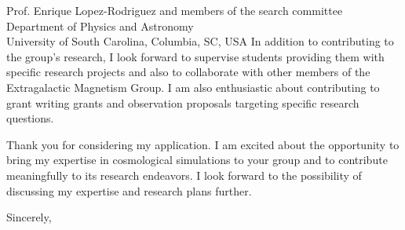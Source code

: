 \documentclass[11pt]{letter}
\begin{document}
\begin{letter}{Prof. Enrique Lopez-Rodriguez and members of the search committee \\ Department of Physics and Astronomy \\ University of South Carolina, Columbia, SC, USA}
In addition to contributing to the group's research, I look forward to supervise students providing them with specific research projects and also to collaborate with other members of the Extragalactic Magnetism Group. I am also enthusiastic about contributing to grant writing grants and observation proposals targeting specific research questions.

Thank you for considering my application. I am excited about the opportunity to bring my expertise in cosmological simulations to your group and to contribute meaningfully to its research endeavors. I look forward to the possibility of discussing my expertise and research plans further.

\closing{Sincerely,}

\end{letter}
\end{document}
